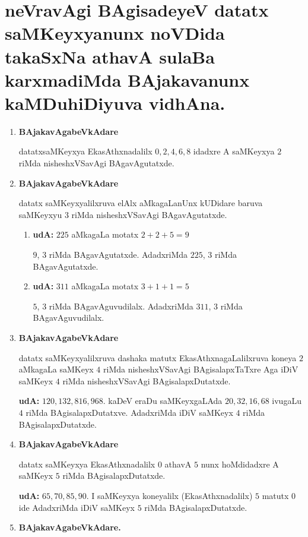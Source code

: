 \chapter{neVravAgi BAgisadeyeV datatx saMKeyxyanunx noVDida takaSxNa athavA sulaBa karxmadiMda BAjakavanunx kaMDuhiDiyuva vidhAna.}
\begin{enumerate}[{\rm 1)}]
\item {} \textbf{BAjakavAgabeVkAdare}

datatxsaMKeyxya EkasAthxnadalilx $0,2,4,6,8$ idadxre A saMKeyxya $2$ riMda \-nisheshxVSavAgi BAgavAgutatxde.

\item {} \textbf{BAjakavAgabeVkAdare}

datatx saMKeyxyalilxruva elAlx aMkagaLanUnx kUDidare baruva saMKeyxyu $3$ riMda nisheshxVSavAgi BAgavAgutatxde.
\begin{enumerate}[{\rm 1)}]
\item \textbf{udA:} \quad $225$ aMkagaLa motatx $2+2+5 =9$

$9$, $3$ riMda BAgavAgutatxde. AdadxriMda $225$, $3$ riMda BAgavAgutatxde.

\item \textbf{udA:} \quad $311$ aMkagaLa motatx $3+1+1 =5$

 $5$, $3$ riMda BAgavAguvudilalx. AdadxriMda $311$, $3$ riMda BAgavAguvudilalx.
\end{enumerate}

\vfill\eject
\item {} \textbf{BAjakavAgabeVkAdare}

datatx saMKeyxyalilxruva dashaka matutx EkasAthxnagaLalilxruva koneya $2$ aMkagaLa saMKeyx $4$ riMda nisheshxVSavAgi BAgisalapxTaTxre Aga iDiV saMKeyx $4$ riMda nisheshxVSavAgi BAgi\-salapxDutatxde.

\textbf{udA:} $120,132,816,968$. kaDeV eraDu saMKeyxgaLAda $20,32,16,68$ ivugaLu $4$ riMda BAgisalapxDutatxve. AdadxriMda iDiV saMKeyx $4$ riMda BAgi\-salapxDutatxde.

\item  {} \textbf{BAjakavAgabeVkAdare}

datatx saMKeyxya EkasAthxnadalilx $0$ athavA $5$ nunx hoMdidadxre A saMKeyx $5$ riMda BAgi\-salapxDutatxde.

\textbf{udA:} $65,70,85,90.$  I saMKeyxya koneyalilx (EkasAthxnadalilx) $5$ matutx $0$ ide AdadxriMda iDiV saMKeyx $5$ riMda BAgisalapxDutatxde.
\item {} \textbf{BAjakavAgabeVkAdare.}


\end{enumerate}
